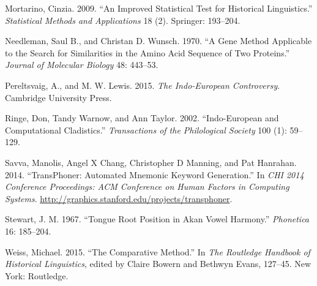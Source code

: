 \documentclass[a4paper]{article}
\begin{document}
\begin{thebibliography}{99}
Mortarino, Cinzia. 2009. ``An Improved Statistical Test for Historical
Linguistics.'' \emph{Statistical Methods and Applications} 18 (2).
Springer: 193--204.

Needleman, Saul B., and Christan D. Wunsch. 1970. ``A Gene Method
Applicable to the Search for Similarities in the Amino Acid Sequence of
Two Proteins.'' \emph{Journal of Molecular Biology} 48: 443--53.

Pereltsvaig, A., and M. W. Lewis. 2015. \emph{The Indo-European
Controversy}. Cambridge University Press.

Ringe, Don, Tandy Warnow, and Ann Taylor. 2002. ``Indo-European and
Computational Cladistics.'' \emph{Transactions of the Philological
Society} 100 (1): 59--129.

Savva, Manolis, Angel X Chang, Christopher D Manning, and Pat Hanrahan.
2014. ``TransPhoner: Automated Mnemonic Keyword Generation.'' In
\emph{CHI 2014 Conference Proceedings: ACM Conference on Human Factors
in Computing Systems}.
\url{http://graphics.stanford.edu/projects/transphoner}.

Stewart, J. M. 1967. ``Tongue Root Position in Akan Vowel Harmony.''
\emph{Phonetica} 16: 185--204.

Weiss, Michael. 2015. ``The Comparative Method.'' In \emph{The Routledge
Handbook of Historical Linguistics}, edited by Claire Bowern and Bethwyn
Evans, 127--45. New York: Routledge.

\end{thebibliography}
\end{document}
